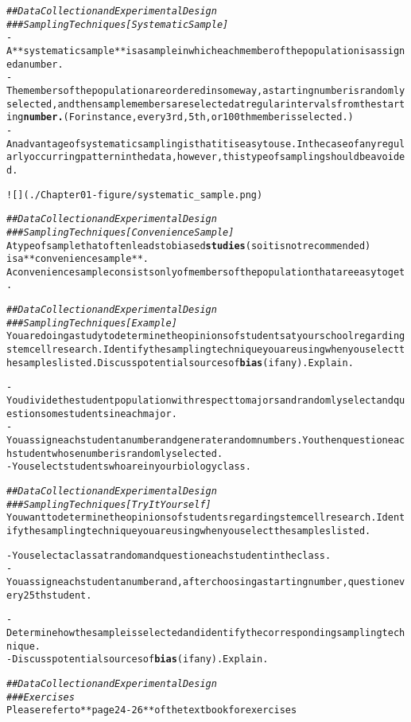 \documentclass{article}\usepackage[]{graphicx}\usepackage[]{color}
\makeatletter
\newcommand{\hlcom}[1]{\textcolor[rgb]{0.678,0.584,0.686}{\textit{#1}}}%
\newcommand{\hlkwd}[1]{\textcolor[rgb]{0.737,0.353,0.396}{\textbf{#1}}}%
\newenvironment{kframe}{%
 \def\at@end@of@kframe{}%
 \ifinner\ifhmode%
  \def\at@end@of@kframe{\end{minipage}}%
  \begin{minipage}{\columnwidth}%
 \fi\fi%
 \def\FrameCommand##1{\hskip\@totalleftmargin \hskip-\fboxsep
 \colorbox{shadecolor}{##1}\hskip-\fboxsep
     \hskip-\linewidth \hskip-\@totalleftmargin \hskip\columnwidth}%
 \MakeFramed {\advance\hsize-\width
   \@totalleftmargin\z@ \linewidth\hsize
   \@setminipage}}%
 {\par\unskip\endMakeFramed%
 \at@end@of@kframe}
\newenvironment{knitrout}{}{} %
\makeatother
\begin{document}
\begin{knitrout}
\begin{kframe}
\begin{alltt}
\hlcom{## Data Collection and Experimental Design}
\hlcom{### Sampling Techniques [Systematic Sample]}
- A **systematic sample** is a sample in which each member of the population is assigned a number.
- The members of the population are ordered in some way, a starting number is randomly selected, and then sample members are selected at regular intervals from the starting \hlkwd{number.} (For instance, every 3rd, 5th, or 100th member is selected.)
- An advantage of systematic sampling is that it is easy to use. In the case of any regularly occurring pattern in the data, however, this type of sampling should be avoided.

![](./Chapter01-figure/systematic_sample.png)

\hlcom{## Data Collection and Experimental Design}
\hlcom{### Sampling Techniques [Convenience Sample]}
A type of sample that often leads to biased \hlkwd{studies} (so it is not recommended)
is a **convenience sample**. 
A convenience sample consists only of members of the population that are easy to get.

\hlcom{## Data Collection and Experimental Design}
\hlcom{### Sampling Techniques [Example]}
You are doing a study to determine the opinions of students at your school regarding stem cell research. Identify the sampling technique you are using when you select the samples listed. Discuss potential sources of \hlkwd{bias} (if any). Explain.

- You divide the student population with respect to majors and randomly select and question some students in each major.
- You assign each student a number and generate random numbers. You then question each student whose number is randomly selected.
- You select students who are in your biology class.

\hlcom{## Data Collection and Experimental Design}
\hlcom{### Sampling Techniques [Try It Yourself]}
You want to determine the opinions of students regarding stem cell research. Identify the sampling technique you are using when you select the samples listed.

- You select a class at random and question each student in the class.
- You assign each student a number and, after choosing a starting number, question every 25th student.

- Determine how the sample is selected and identify the corresponding sampling technique.
- Discuss potential sources of \hlkwd{bias} (if any). Explain.

\hlcom{## Data Collection and Experimental Design}
\hlcom{### Exercises}
Please refer to **page 24-26** of the textbook for exercises


\end{alltt}
\end{kframe}
\end{knitrout}
\end{document}
